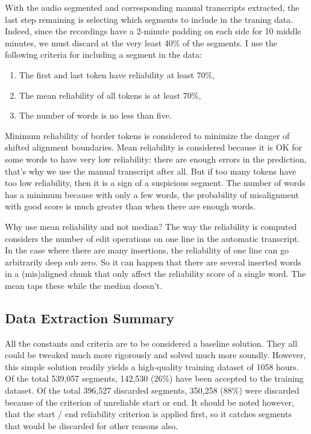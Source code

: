 \documentclass[conference]{IEEEtran}
\begin{document}
With the audio segmented and corresponding manual transcripts extracted, the
last step remaining is selecting which segments to include in the traning data.
Indeed, since the recordings have a 2-minute padding on each side for 10 middle
minutes, we must discard at the very least 40\% of the segments. I use the
following criteria for including a segment in the data:

\begin{enumerate}
\item{The first and last token have reliability at least 70\%,}
\item{The mean reliability of all tokens is at least 70\%,}
\item{The number of words is no less than five.}
\end{enumerate}

Minimum reliability of border tokens is considered to minimize the danger of
shifted alignment boundaries. Mean reliability is considered because it is OK
for some words to have very low reliability: there are enough errors in the
prediction, that's why we use the manual transcript after all. But if too many
tokens have too low reliability, then it is a sign of a suspicious segment. The
number of words has a minimum because with only a few words, the probability of
misalignment with good score is much greater than when there are enough words.

Why use mean reliability and not median? The way the reliability is computed
considers the number of edit operations on one line in the automatic transcript.
In the case where there are many insertions, the reliability of one line can go
arbitrarily deep sub zero. So it can happen that there are several inserted
words in a (mis)aligned chunk that only affect the reliability score of a single
word. The mean taps these while the median doesn't.

\subsection{Data Extraction Summary}

All the constants and criteria are to be considered a baseline solution. They
all could be tweaked much more rigorously and solved much more soundly. However,
this simple solution readily yields a high-quality training dataset of 1058
hours. Of the total 539,057 segments, 142,530 (26\%) have been accepted to the
training dataset. Of the total 396,527 discarded segments, 350,258 (88\%) were
discarded because of the criterion of unreliable start or end. It should be
noted however, that the start / end reliability criterion is applied first, so
it catches segments that would be discarded for other reasons also.
\end{document}
